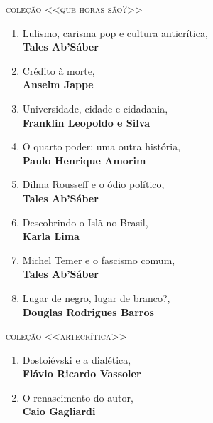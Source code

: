 \medskip
{\large\textsc{coleção <<que horas são?>>}}

\begin{enumerate} [font=\Formular\scriptsize]
\setlength\parskip{8pt}
\setlength\itemsep{-1.4mm}
\item Lulismo, carisma pop e cultura anticrítica,\\ \textbf{Tales Ab'Sáber}
\item Crédito à morte,\\ \textbf{Anselm Jappe}
\item Universidade, cidade e cidadania,\\ \textbf{Franklin Leopoldo e Silva}
\item O quarto poder: uma outra história,\\ \textbf{Paulo Henrique Amorim}
\item Dilma Rousseff e o ódio político,\\ \textbf{Tales Ab'Sáber}
\item Descobrindo o Islã no Brasil,\\ \textbf{Karla Lima}
\item Michel Temer e o fascismo comum,\\ \textbf{Tales Ab'Sáber}
\item Lugar de negro, lugar de branco?,\\ \textbf{Douglas Rodrigues Barros}
\end{enumerate}

\medskip
{\large\textsc{coleção <<artecrítica>>}}

\begin{enumerate} [font=\Formular\scriptsize]
\setlength\parskip{8pt}
\setlength\itemsep{-1.4mm}
\item Dostoiévski e a dialética,\\ \textbf{Flávio Ricardo Vassoler}
\item O renascimento do autor,\\ \textbf{Caio Gagliardi}
\end{enumerate}

\endgroup

\pagebreak
\ifodd\thepage\paginabranca\else\clearpage\fi
